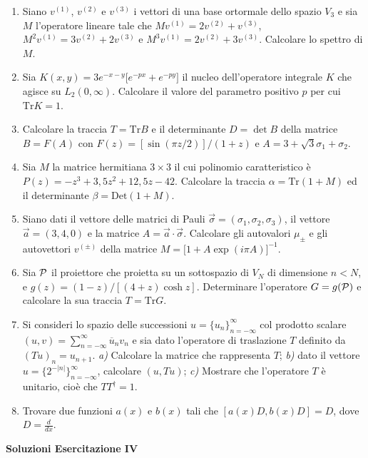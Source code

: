 \documentclass[a4paper,10pt]{article}
\begin{document}
\begin{enumerate}
\item Siano $v^{(1)}$, $v^{(2)}$ e $v^{(3)}$ 
i vettori di una base ortormale dello spazio $V_3$
e sia $M$ l'operatore lineare
tale che $M v^{(1)}= 2 v^{(2)} + v^{(3)}$,
$M^2 v^{(1)}= 3 v^{(2)}+ 2 v^{(3)}$ e $M^3 v^{(1)}= 2 v^{(2)}+ 3 v^{(3)}$.
Calcolare lo spettro di $M$.
\item Sia $K(x,y) = 3 e^{-x-y} \Big[ e^{-px} + e^{-py} \Big]$ il nucleo
dell'operatore integrale $K$ che agisce su $L_2(0,\infty)$.
Calcolare il valore del parametro positivo $p$ per cui $\text{Tr} K = 1$.
\item Calcolare la traccia $T=\text{Tr}B$ e il determinante $D=\det B$
della matrice $B=F(A)$ con $F(z)=[\sin (\pi z/2)]/(1+z)$ e
$A = 3 + \sqrt{3} \sigma_1 + \sigma_2$.
\item Sia $M$ la matrice hermitiana $3 \times 3$ il cui polinomio
caratteristico \`e $P(z)=-z^3 + 3,5 z^2 + 12,5 z - 42$. Calcolare la traccia
$\alpha = \text{Tr} (1 + M)$ ed il determinante $\beta = \text{Det} (1+M)$.
\item Siano dati il vettore delle matrici di Pauli $\vec{\sigma} = (\sigma_1,\sigma_2,\sigma_3)$, il vettore $\vec{a}=(3,4,0)$ e la matrice 
$A=\vec{a} \cdot \vec{\sigma}$. Calcolare gli autovalori $\mu_{\pm}$ e gli  autovettori $v^{(\pm)}$ della
matrice $M = \Big[ 1 + A \exp (i \pi A) \Big]^{-1}$.
\item Sia ${\cal P}$ il proiettore che proietta su un sottospazio di $V_N$
di dimensione $n<N$, e $g(z)=(1-z)/[(4+z) \cosh z]$. Determinare l'operatore
$G=g({\cal P})$ e calcolare la sua traccia $T=\text{Tr} G$.
\item Si consideri lo spazio delle successioni
$u = \{ u_n \}_{n=-\infty}^\infty$
col prodotto scalare $(u,v)=\sum_{n=-\infty}^{\infty} \overline{u}_n v_n$ e
sia dato l'operatore di traslazione $T$ definito da $(T u)_n = u_{n+1}$.
{\it a)} Calcolare la matrice che rappresenta $T$; {\it b)} dato il vettore
$u =  \{ 2^{-|n|} \}_{n=-\infty}^\infty$, calcolare $(u,Tu)$;
{\it c)} Mostrare che l'operatore $T$ \`e unitario, cio\`e che $T T^\dag = 1$.
\item Trovare due funzioni $a(x)$ e $b(x)$ tali che $[ a(x) D , b(x) D] = D$,
dove $D=\frac{d}{dx}$.
\end{enumerate}
\centerline{\LARGE \bf Soluzioni Esercitazione IV}
\vskip10pt
\end{document}

